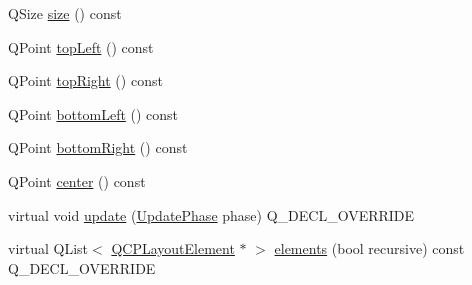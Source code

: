 \begin{DoxyCompactItemize}
\item 
Q\+Size \hyperlink{classQCPAxisRect_a871b9fe49e92b39a3cbe29a59e458536}{size} () const 
\item 
Q\+Point \hyperlink{classQCPAxisRect_a88acbe716bcf5072790a6f95637c40d8}{top\+Left} () const 
\item 
Q\+Point \hyperlink{classQCPAxisRect_a232409546394c23b59407bc62fa460a8}{top\+Right} () const 
\item 
Q\+Point \hyperlink{classQCPAxisRect_a724b0333971ea6a338f0dbd814dc97ae}{bottom\+Left} () const 
\item 
Q\+Point \hyperlink{classQCPAxisRect_a49ea3c7dff834b47e266cbf3d79f78b9}{bottom\+Right} () const 
\item 
Q\+Point \hyperlink{classQCPAxisRect_aea5e6042bca198424fa1bc02fc282e59}{center} () const 
\item 
virtual void \hyperlink{classQCPAxisRect_add049d464b9ef2ccdc638adc4ccb4aca}{update} (\hyperlink{classQCPLayoutElement_a0d83360e05735735aaf6d7983c56374d}{Update\+Phase} phase) Q\+\_\+\+D\+E\+C\+L\+\_\+\+O\+V\+E\+R\+R\+I\+DE
\item 
virtual Q\+List$<$ \hyperlink{classQCPLayoutElement}{Q\+C\+P\+Layout\+Element} $\ast$ $>$ \hyperlink{classQCPAxisRect_a3aee067fd105f2fa8de9eb8024435ac5}{elements} (bool recursive) const Q\+\_\+\+D\+E\+C\+L\+\_\+\+O\+V\+E\+R\+R\+I\+DE
\end{DoxyCompactItemize}
